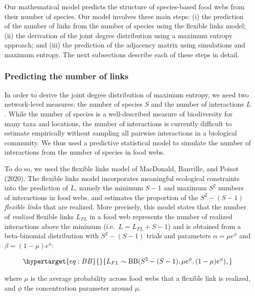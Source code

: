 \documentclass[10pt,oneside]{article}
\begin{document}
Our mathematical model predicts the structure of species-based food webs
from their number of species. Our model involves three main steps: (i)
the prediction of the number of links from the number of species using
the flexible links model; (ii) the derivation of the joint degree
distribution using a maximum entropy approach; and (iii) the prediction
of the adjacency matrix using simulations and maximum entropy. The next
subsections describe each of these steps in detail.

\hypertarget{predicting-the-number-of-links}{%
\subsubsection{Predicting the number of
links}\label{predicting-the-number-of-links}}

In order to derive the joint degree distribution of maximum entropy, we
need two network-level measures: the number of species \(S\) and the
number of interactions \(L\). While the number of species is a
well-described measure of biodiversity for many taxa and locations, the
number of interactions is currently difficult to estimate empirically
without sampling all pairwise interactions in a biological community. We
thus used a predictive statistical model to simulate the number of
interactions from the number of species in food webs.

To do so, we used the flexible links model of MacDonald, Banville, and
Poisot (2020). The flexible links model incorporates meaningful
ecological constraints into the prediction of \(L\), namely the minimum
\(S-1\) and maximum \(S^2\) numbers of interactions in food webs, and
estimates the proportion of the \(S^2 - (S - 1)\) \emph{flexible links}
that are realized. More precisely, this model states that the number of
\emph{realized} flexible links \(L_{FL}\) in a food web represents the
number of realized interactions above the minimum
(i.e.~\(L = L_{FL} + S - 1\)) and is obtained from a beta-binomial
distribution with \(S^2 - (S - 1)\) trials and parameters
\(\alpha = \mu e^\phi\) and \(\beta = (1 - \mu) e^\phi\):

\begin{equation}\protect\hypertarget{eq:BB}{}{L_{FL} \sim \mathrm{BB}(S^2 - (S - 1), \mu e^\phi, (1 - \mu) e^\phi),}\label{eq:BB}\end{equation}

where \(\mu\) is the average probability across food webs that a
flexible link is realized, and \(\phi\) the concentration parameter
around \(\mu\).
\end{document}

